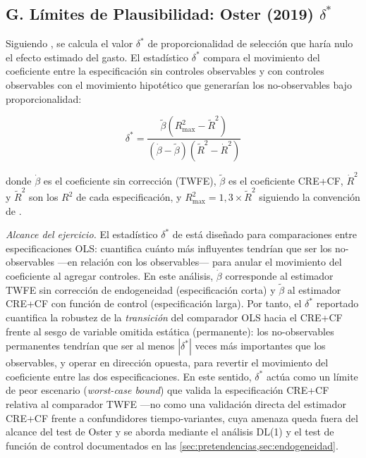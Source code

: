 \subsection*{G. Límites de Plausibilidad: Oster (2019) $\delta^*$}
\label{sec:appendix_oster}

Siguiendo \citet{Oster2019}, se calcula el valor $\delta^*$ de proporcionalidad de selección que haría nulo el efecto estimado del gasto.
El estadístico $\delta^*$ compara el movimiento del coeficiente entre la especificación sin controles observables y con controles observables con el movimiento hipotético que generarían los no-observables bajo proporcionalidad:

\begin{equation}
  \delta^* = \frac{\tilde{\beta}(R^2_{\max} - \tilde{R}^2)}{(\dot{\beta} - \tilde{\beta})(\tilde{R}^2 - \dot{R}^2)}
  \label{eq:oster}
\end{equation}

\noindent donde $\dot{\beta}$ es el coeficiente sin corrección (TWFE), $\tilde{\beta}$ es el coeficiente CRE+CF,
$\dot{R}^2$ y $\tilde{R}^2$ son los $R^2$ de cada especificación,
y $R^2_{\max} = 1{,}3 \times \tilde{R}^2$ siguiendo la convención de \citet{Oster2019}.

\textit{Alcance del ejercicio.}
El estadístico $\delta^*$ de \citet{Oster2019} está diseñado para comparaciones entre especificaciones OLS: cuantifica cuánto más influyentes tendrían que ser los no-observables ---en relación con los observables--- para anular el movimiento del coeficiente al agregar controles.
En este análisis, $\dot{\beta}$ corresponde al estimador TWFE sin corrección de endogeneidad (especificación corta) y $\tilde{\beta}$ al estimador CRE+CF con función de control (especificación larga).
Por tanto, el $\delta^*$ reportado cuantifica la robustez de la \textit{transición} del comparador OLS hacia el CRE+CF frente al sesgo de variable omitida estática (permanente): los no-observables permanentes tendrían que ser al menos $|\delta^*|$ veces más importantes que los observables, y operar en dirección opuesta, para revertir el movimiento del coeficiente entre las dos especificaciones.
En este sentido, $\delta^*$ actúa como un límite de peor escenario (\textit{worst-case bound}) que valida la especificación CRE+CF relativa al comparador TWFE ---no como una validación directa del estimador CRE+CF frente a confundidores tiempo-variantes, cuya amenaza queda fuera del alcance del test de Oster y se aborda mediante el análisis DL(1) y el test de función de control documentados en las \cref{sec:pretendencias,sec:endogeneidad}.


